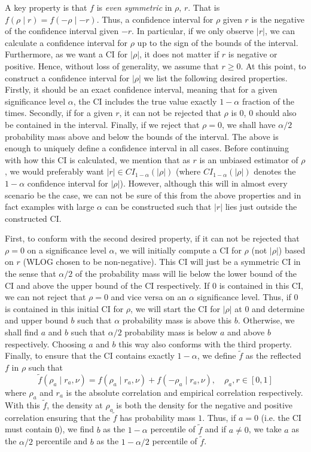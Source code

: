 \documentclass[../Thesis.tex]{subfiles}
\begin{document}
A key property is that $f$ is \textit{even symmetric} in $\rho,\, r$. That is $f(\rho \mid r) = f(-\rho \mid -r)$. Thus, a confidence interval for $\rho$ given $r$ is the negative of the confidence interval given $-r$. In particular, if we only observe $|r|$, we can calculate a confidence interval for $\rho$ up to the sign of the bounds of the interval. Furthermore, as we want a CI for $|\rho|$, it does not matter if $r$ is negative or positive. Hence, without loss of generality, we assume that $r \geq 0$. At this point, to construct a confidence interval for $|\rho|$ we list the following desired properties. Firstly, it should be an exact confidence interval, meaning that for a given significance level $\alpha$, the CI includes the true value exactly $1-\alpha$ fraction of the times. Secondly, if for a given $r$, it can not be rejected that $\rho$ is 0, 0 should also be contained in the interval. Finally, if we reject that $\rho = 0$, we shall have $\alpha/2$ probability mass above and below the bounds of the interval. The above is enough to uniquely define a confidence interval in all cases. Before continuing with how this CI is calculated, we mention that as $r$ is an unbiased estimator of $\rho$, we would preferably want $|r| \in CI_{1-\alpha}\left(|\rho|\right)$ (where $CI_{1-\alpha}\left(|\rho|\right)$ denotes the $1-\alpha$ confidence interval for $|\rho|$). However, although this will in almost every scenario be the case, we can not be sure of this from the above properties and in fact examples with large $\alpha$ can be constructed such that $|r|$ lies just outside the constructed CI.

First, to conform with the second desired property, if it can not be rejected that $\rho = 0$ on a significance level $\alpha$, we will initially compute a CI for $\rho$ (not $|\rho|$) based on $r$ (WLOG chosen to be non-negative). This CI will just be a symmetric CI in the sense that $\alpha/2$ of the probability mass will lie below the lower bound of the CI and above the upper bound of the CI respectively. If $0$ is contained in this CI, we can not reject that $\rho=0$ and vice versa on an $\alpha$ significance level. Thus, if $0$ is contained in this initial CI for $\rho$, we will start the CI for $|\rho|$ at $0$ and determine and upper bound $b$ such that $\alpha$ probability mass is above this $b$. Otherwise, we shall find $a$ and $b$ such that $\alpha/2$ probability mass is below $a$ and above $b$ respectively. Choosing $a$ and $b$ this way also conforms with the third property. Finally, to ensure that the CI contains exactly $1-\alpha$, we define $\tilde{f}$ as the reflected $f$ in $\rho$ such that
$$\tilde{f}\left(\rho_a \mid r_a, \nu\right) = f(\rho_a \mid r_a, \nu) + f(-\rho_a \mid r_a, \nu),\quad \rho_a,r \in [0,1]$$
where $\rho_a$ and $r_a$ is the absolute correlation and empirical correlation respectively. With this $\tilde{f}$, the density at $\rho_a$ is both the density for the negative and positive correlation ensuring that the $\tilde{f}$ has probability mass $1$. Thus, if $a=0$ (i.e. the CI must contain $0$), we find $b$ as the $1-\alpha$ percentile of $\tilde{f}$ and if $a\neq 0$, we take $a$ as the $\alpha/2$ percentile and $b$ as the $1-\alpha/2$ percentile of $\tilde{f}$.
\end{document}
